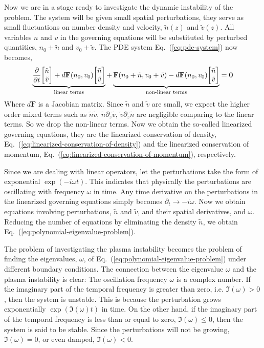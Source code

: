 Now we are in a stage ready to investigate the dynamic instability of the problem. The system will be given small spatial perturbations, they serve as small fluctuations on number density and velocity, $\tilde{n}(z)$ and $\tilde{v}(z)$. All variables $n$ and $v$ in the governing equations will be substituted by perturbed quantities, $n_0+\tilde{n}$ and $v_0+\tilde{v}$. The PDE system Eq.~(\ref{eq:pde-system}) now becomes,
\begin{equation}
	\underbrace{\pdv{t}\mqty[\tilde{n}\\ \tilde{v}] + d\mathbf{F}(n_0,v_0)\mqty[\tilde{n}\\ \tilde{v}] }_{\text{linear terms}}
	+ \underbrace{\mathbf{F}(n_0+\tilde{n}, v_0+\tilde{v}) - d\mathbf{F}(n_0,v_0)\mqty[\tilde{n}\\ \tilde{v}]}_{\text{non-linear terms}}
	= \mathbf{0}
	\label{eq:perturbed-pde-system}
\end{equation}
Where $d\mathbf{F}$ is a Jacobian matrix. Since $\tilde{n}$ and $\tilde{v}$ are small, we expect the higher order mixed terms such as $\tilde{n}\tilde{v}$, $\tilde{n}\partial_z\tilde{v}$, $\tilde{v}\partial_z\tilde{n}$ are negligible comparing to the linear terms. So we drop the non-linear terms. Now we obtain the so-called linearized governing equations, they are the linearized conservation of density, Eq.~(\ref{eq:linearized-conservation-of-density}) and the linearized conservation of momentum, Eq.~(\ref{eq:linearized-conservation-of-momentum}), respectively.

Since we are dealing with linear operators, let the perturbations take the form of exponential $\exp(-i\omega t)$. This indicates that physically the perturbations are oscillating with frequency $\omega$ in time. Any time derivative on the perturbations in the linearized governing equations simply becomes $\partial_t \to -i\omega$. Now we obtain equations involving perturbations, $\tilde{n}$ and $\tilde{v}$, and their spatial derivatives, and $\omega$. Reducing the number of equations by eliminating the density $\tilde{n}$, we obtain Eq.~(\ref{eq:polynomial-eigenvalue-problem}).

The problem of investigating the plasma instability becomes the problem of finding the eigenvalues, $\omega$, of Eq.~(\ref{eq:polynomial-eigenvalue-problem}) under different boundary conditions. The connection between the eigenvalue $\omega$ and the plasma instability is clear: The oscillation frequency $\omega$ is a complex number. If the imaginary part of the temporal frequency is greater than zero, i.e. $\Im(\omega) > 0$, then the system is unstable. This is because the perturbation grows exponentially $\exp(\Im(\omega)t)$ in time. On the other hand, if the imaginary part of the temporal frequency is less than or equal to zero, $\Im(\omega) \leq 0$, then the system is said to be stable. Since the perturbations will not be growing, $\Im(\omega)=0$, or even damped, $\Im(\omega) < 0$.

